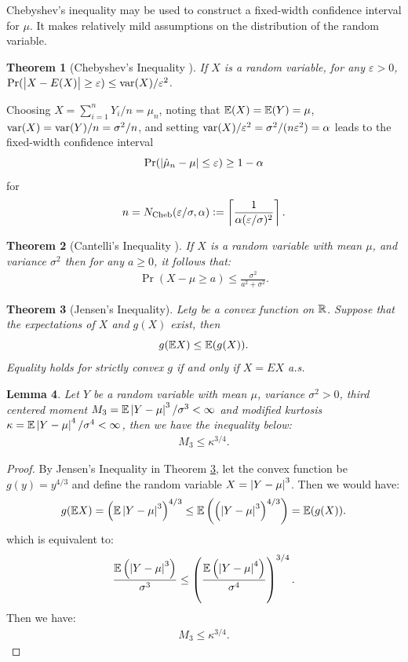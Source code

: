 \documentclass{iitthesis}
\newtheorem{theorem}{Theorem}[section]
\newtheorem{lemma}[theorem]{Lemma}
\begin{document}
Chebyshev's inequality may be used to construct a fixed-width confidence interval for $\mu$.  It makes relatively mild assumptions on the distribution of the random variable.

\begin{theorem}[Chebyshev's Inequality {\cite[6.1.c]{LB10}}] \label{ChebyThm}If $X$ is a random variable, for any $\varepsilon>0$, $\Pr(\left \lvert X-E(X) \right \rvert \ge \varepsilon) \le  \operatorname{var}(X)/\varepsilon^2$.
\end{theorem}
Choosing $X=\sum_{i=1}^n Y_i/n = \mu_n $, noting that $\mathbb{E}(X) = \mathbb{E}(Y) = \mu$, $\operatorname{var}(X) = \operatorname{var}(Y)/n = \sigma^2/n$, and setting $\operatorname{var}(X)/\varepsilon^2=\sigma^2/(n\varepsilon^2) = \alpha$ leads to the fixed-width confidence interval 
\[
\Pr(\left \lvert \hat{\mu}_{n}-\mu \right \rvert \le \varepsilon) \ge 1- \alpha 
\]
 for 
 \begin{align}
n=N_{\text{Cheb}}(\varepsilon/\sigma,\alpha):= \left \lceil \frac{1}{\alpha (\varepsilon/\sigma)^2} \right \rceil.
 \end{align}
\begin{theorem}[Cantelli's Inequality {\cite[6.1.e]{LB10}}]\label{CanThm} If $X$ is a random variable with mean $\mu$, and variance $\sigma^2$ then for any $a \geq 0$, it follows that: 
\begin{align}
\Pr(X-\mu \ge a) \le  \frac{\sigma^2}{a^2+\sigma^2}.
\end{align}
\end{theorem}
\begin{theorem}[Jensen's Inequality{\cite[8.4a]{LB10}}]\label{Jensen}
Let$g$ be a convex function on $\mathbb{R}$. Suppose that the expectations of $X$ and $g(X)$ exist, then
$$g(\mathbb{E} X) \leq \mathbb{E}(g(X)).$$
Equality holds for strictly convex $g$ if and only if $X=EX$ a.s.

\end{theorem}
\begin{lemma}\label{M3kappalemma}
Let $Y$ be a random variable with mean $\mu$, variance $\sigma^2>0$, third centered moment $M_3 = \mathbb{E}\left \lvert Y-\mu \right \rvert^3/\sigma^3 < \infty$ and modified kurtosis $\kappa = \mathbb{E}\left \lvert Y-\mu \right \rvert^4/\sigma^4< \infty$, then we have the inequality below:
\begin{align}\label{M3kappa}
M_3\leq \kappa^{3/4}.
\end{align}
\end{lemma}
\begin{proof}
By Jensen's Inequality in Theorem \ref{Jensen}, let the convex function be $g(y) = y^{4/3}$ and define the random variable $X = \left \lvert Y-\mu \right \rvert^3$. Then we would have:
$$g(\mathbb{E} X) = \left (\mathbb{E}\left \lvert Y-\mu \right \rvert^3\right)^{4/3} \leq \mathbb{E}\left(\left(\left \lvert Y-\mu \right \rvert^3\right)^{4/3}\right) = \mathbb{E}(g(X)).$$
which is equivalent to:
$$\frac{\mathbb{E}\left(\left \lvert Y-\mu \right \rvert^3\right)}{\sigma^3} \leq \left (\frac{\mathbb{E}\left(\left \lvert Y-\mu \right \rvert^4\right)}{\sigma^4}\right)^{3/4}.$$
Then we have:
\begin{align}
M_3\leq \kappa^{3/4}.
\end{align}
\end{proof}
\end{document}
